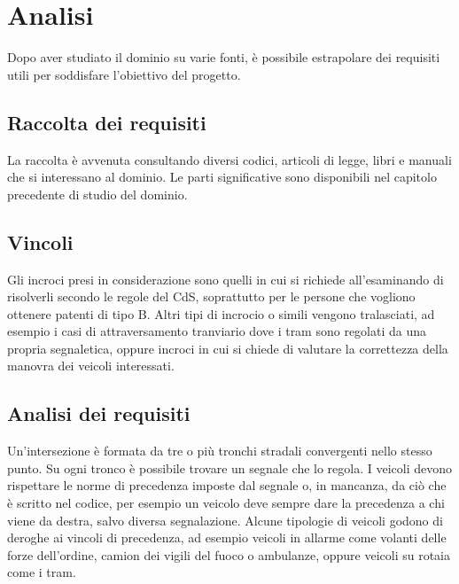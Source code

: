 \chapter{Analisi}

Dopo aver studiato il dominio su varie fonti, è possibile estrapolare dei requisiti utili per soddisfare l'obiettivo del progetto.

\section{Raccolta dei requisiti}
La raccolta è avvenuta consultando diversi codici, articoli di legge, libri e manuali che si interessano al dominio. Le parti significative sono disponibili nel capitolo precedente di studio del dominio.

\section{Vincoli}
Gli incroci presi in considerazione sono quelli in cui si richiede all'esaminando di risolverli secondo le regole del CdS, soprattutto per le persone che vogliono ottenere patenti di tipo B. Altri tipi di incrocio o simili vengono tralasciati, ad esempio i casi di attraversamento tranviario dove i tram sono regolati da una propria segnaletica, oppure incroci in cui si chiede di valutare la correttezza della manovra dei veicoli interessati.

\section{Analisi dei requisiti}
Un'intersezione è formata da tre o più tronchi stradali convergenti nello stesso punto. Su ogni tronco è possibile trovare un segnale che lo regola. I veicoli devono rispettare le norme di precedenza imposte dal segnale o, in mancanza, da ciò che è scritto nel codice, per esempio un veicolo deve sempre dare la precedenza a chi viene da destra, salvo diversa segnalazione. Alcune tipologie di veicoli godono di deroghe ai vincoli di precedenza, ad esempio veicoli in allarme come volanti delle forze dell'ordine, camion dei vigili del fuoco o ambulanze, oppure veicoli su rotaia come i tram.

